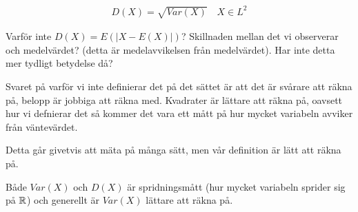 \begin{equation*}
  \begin{gathered}
    D(X) = \sqrt{Var(X)}\quad X\in L^2
  \end{gathered}
\end{equation*}
\par\bigskip
\noindent Varför inte $D(X) = E(\left|X-E(X)\right|)$? Skillnaden mellan det vi observerar och medelvärdet? (detta är medelavvikelsen från medelvärdet). Har inte detta mer tydligt betydelse då?
\par\bigskip
\noindent Svaret på varför vi inte definierar det på det sättet är att det är svårare att räkna på, belopp är jobbiga att räkna med. Kvadrater är lättare att räkna på, oavsett hur vi defnierar det så kommer det vara ett mått på hur mycket variabeln avviker från väntevärdet.
\par\bigskip
\noindent Detta går givetvis att mäta på många sätt, men vår definition är lätt att räkna på.
\par\bigskip
\noindent Både $Var(X)$ och $D(X)$ är spridningsmått (hur mycket variabeln sprider sig på $\mathbb{R}$) och generellt är $Var(X)$ lättare att räkna på. 

